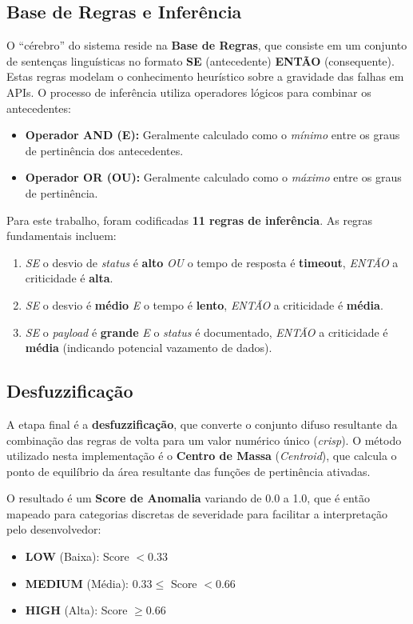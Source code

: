 \subsection{Base de Regras e Inferência}

O ``cérebro'' do sistema reside na \textbf{Base de Regras}, que consiste em um conjunto de sentenças linguísticas no formato \textbf{SE} (antecedente) \textbf{ENTÃO} (consequente). Estas regras modelam o conhecimento heurístico sobre a gravidade das falhas em APIs. O processo de inferência utiliza operadores lógicos para combinar os antecedentes:

\begin{itemize}
    \item \textbf{Operador AND (E):} Geralmente calculado como o \textit{mínimo} entre os graus de pertinência dos antecedentes.
    \item \textbf{Operador OR (OU):} Geralmente calculado como o \textit{máximo} entre os graus de pertinência.
\end{itemize}

Para este trabalho, foram codificadas \textbf{11 regras de inferência}. As regras fundamentais incluem:

\begin{enumerate}
    \item \textit{SE} o desvio de \textit{status} é \textbf{alto} \textit{OU} o tempo de resposta é \textbf{timeout}, \textit{ENTÃO} a criticidade é \textbf{alta}.
    \item \textit{SE} o desvio é \textbf{médio} \textit{E} o tempo é \textbf{lento}, \textit{ENTÃO} a criticidade é \textbf{média}.
    \item \textit{SE} o \textit{payload} é \textbf{grande} \textit{E} o \textit{status} é documentado, \textit{ENTÃO} a criticidade é \textbf{média} (indicando potencial vazamento de dados).
\end{enumerate}

\subsection{Desfuzzificação}

A etapa final é a \textbf{desfuzzificação}, que converte o conjunto difuso resultante da combinação das regras de volta para um valor numérico único (\textit{crisp}). O método utilizado nesta implementação é o \textbf{Centro de Massa} (\textit{Centroid}), que calcula o ponto de equilíbrio da área resultante das funções de pertinência ativadas.

O resultado é um \textbf{Score de Anomalia} variando de 0.0 a 1.0, que é então mapeado para categorias discretas de severidade para facilitar a interpretação pelo desenvolvedor:

\begin{itemize}
    \item \textbf{LOW} (Baixa): Score $< 0.33$
    \item \textbf{MEDIUM} (Média): $0.33 \leq$ Score $< 0.66$
    \item \textbf{HIGH} (Alta): Score $\geq 0.66$
\end{itemize}
